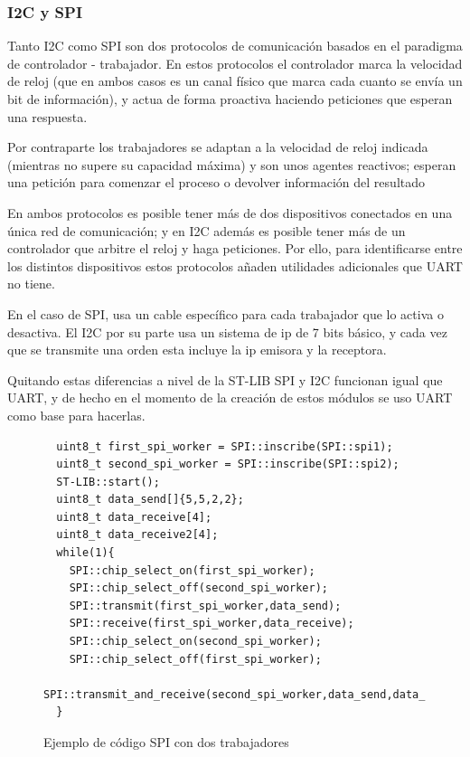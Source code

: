 \documentclass{report}
\begin{document}
\subsubsection{I2C y SPI}
Tanto I2C como SPI son dos protocolos de comunicación basados en el paradigma de controlador - trabajador. En estos protocolos el controlador marca la velocidad de reloj (que en ambos casos es un canal físico que marca cada cuanto se envía un bit de información), y actua de forma proactiva haciendo peticiones que esperan una respuesta. \par
Por contraparte los trabajadores se adaptan a la velocidad de reloj indicada (mientras no supere su capacidad máxima) y son unos agentes reactivos; esperan una petición para comenzar el proceso o devolver información del resultado \par \vspace{0.3cm}
En ambos protocolos es posible tener más de dos dispositivos conectados en una única red de comunicación; y en I2C además es posible tener más de un controlador que arbitre el reloj y haga peticiones. Por ello, para identificarse entre los distintos dispositivos estos protocolos añaden utilidades adicionales que UART no tiene. \par
En el caso de SPI, usa un cable específico para cada trabajador que lo activa o desactiva. El I2C por su parte usa un sistema de ip de 7 bits básico, y cada vez que se transmite una orden esta incluye la ip emisora y la receptora. \par \vspace{0.3cm}
Quitando estas diferencias a nivel de la ST-LIB SPI y I2C funcionan igual que UART, y de hecho en el momento de la creación de estos módulos se uso UART como base para hacerlas. \par
\begin{figure}[h]
\begin{lstlisting}
  uint8_t first_spi_worker = SPI::inscribe(SPI::spi1);
  uint8_t second_spi_worker = SPI::inscribe(SPI::spi2);
  ST-LIB::start();
  uint8_t data_send[]{5,5,2,2};
  uint8_t data_receive[4];
  uint8_t data_receive2[4];
  while(1){
    SPI::chip_select_on(first_spi_worker);
    SPI::chip_select_off(second_spi_worker);
    SPI::transmit(first_spi_worker,data_send);
    SPI::receive(first_spi_worker,data_receive);
    SPI::chip_select_on(second_spi_worker);
    SPI::chip_select_off(first_spi_worker);
    SPI::transmit_and_receive(second_spi_worker,data_send,data_receive2);
  }
\end{lstlisting}
\caption{Ejemplo de código SPI con dos trabajadores}
  \label{SPIcode}
\end{figure}
\end{document}
